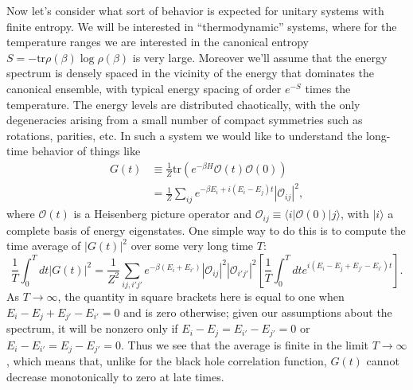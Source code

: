 \documentclass[12pt]{article}
\newcommand{\be}{\begin{equation}}
\newcommand{\ee}{\end{equation}}
\newcommand{\lan}{\langle}
\newcommand{\ran}{\rangle}
\newcommand{\tr}{\mathrm{tr}}
\newcommand{\mO}{\mathcal{O}}
\begin{document}
Now let's consider what sort of behavior is expected for unitary systems with finite entropy. We will be interested in ``thermodynamic'' systems, where for the temperature ranges we are interested in the canonical entropy $S=-\tr \rho(\beta) \log \rho(\beta)$ is very large.  Moreover we'll assume that the energy spectrum is densely spaced in the vicinity of the energy that dominates the canonical ensemble, with typical energy spacing of order $e^{-S}$ times the temperature.  The energy levels are distributed chaotically, with the only degeneracies arising from a small number of compact symmetries such as rotations, parities, etc.  In such a system we would like to understand the long-time behavior of things like
\begin{align}\label{thermal2pt}
G(t)&\equiv \frac{1}{Z}\tr \left(e^{-\beta H}\mO(t)\mO(0)\right)\\
&=\frac{1}{Z}\sum_{ij}e^{-\beta E_i +i(E_i-E_j)t}|\mO_{ij}|^2,
\end{align} 
where $\mO(t)$ is a Heisenberg picture operator and $\mO_{ij}\equiv \lan i|\mO(0)|j\ran$, with $|i\ran$ a complete basis of energy eigenstates.  One simple way to do this is to compute the time average of $|G(t)|^2$ over some very long time $T$:
\be\label{averageG}
\frac{1}{T}\int_0^T dt |G(t)|^2=\frac{1}{Z^2}\sum_{ij,i'j'}e^{-\beta(E_i+E_{i'})}|\mO_{ij}|^2|\mO_{i'j'}|^2 \left[\frac{1}{T}\int_0^T dt e^{i(E_i-E_j+E_{j'}-E_{i'})t}\right].
\ee
As $T\to \infty$, the quantity in square brackets here is equal to one when $E_i-E_j+E_{j'}-E_{i'}=0$ and is zero otherwise; given our assumptions about the spectrum, it will be nonzero only if $E_i-E_j=E_{i'}-E_{j'}=0$ or $E_{i}-E_{i'}=E_j-E_{j'}=0$.  Thus we see that the average is finite in the limit $T\to\infty$, which means that, unlike for the black hole correlation function, $G(t)$ cannot decrease monotonically to zero at late times.  
\end{document}
